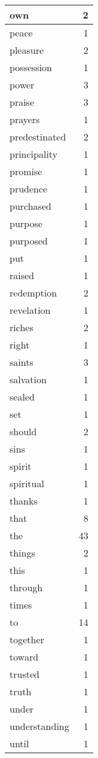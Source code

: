 \begin{center}
\begin{longtable}{l|r}
own & 2\\ \hline 
peace & 1\\ \hline 
pleasure & 2\\ \hline 
possession & 1\\ \hline 
power & 3\\ \hline 
praise & 3\\ \hline 
prayers & 1\\ \hline 
predestinated & 2\\ \hline 
principality & 1\\ \hline 
promise & 1\\ \hline 
prudence & 1\\ \hline 
purchased & 1\\ \hline 
purpose & 1\\ \hline 
purposed & 1\\ \hline 
put & 1\\ \hline 
raised & 1\\ \hline 
redemption & 2\\ \hline 
revelation & 1\\ \hline 
riches & 2\\ \hline 
right & 1\\ \hline 
saints & 3\\ \hline 
salvation & 1\\ \hline 
sealed & 1\\ \hline 
set & 1\\ \hline 
should & 2\\ \hline 
sins & 1\\ \hline 
spirit & 1\\ \hline 
spiritual & 1\\ \hline 
thanks & 1\\ \hline 
that & 8\\ \hline 
the & 43\\ \hline 
things & 2\\ \hline 
this & 1\\ \hline 
through & 1\\ \hline 
times & 1\\ \hline 
to & 14\\ \hline 
together & 1\\ \hline 
toward & 1\\ \hline 
trusted & 1\\ \hline 
truth & 1\\ \hline 
under & 1\\ \hline 
understanding & 1\\ \hline 
until & 1\\ \hline 

\end{longtable}
\end{center}
